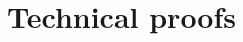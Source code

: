 \documentclass{amsart}[11pt]
\numberwithin{equation}{section}
\numberwithin{theorem}{subsection}
\numberwithin{proposition}{subsection}
\numberwithin{definition}{subsection}
\numberwithin{lemma}{subsection}
\numberwithin{assumption}{subsection}
\newcommand{\D}{\mathrm{d}}
\begin{document}
 


\appendix

\section{Technical proofs}\label{apx:proofs}

\end{document}

